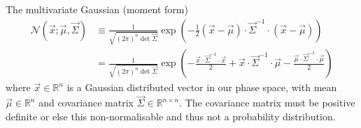 \documentclass[11pt,twoside]{report}
\begin{document}
The multivariate Gaussian (moment form)
\begin{equation}
  \begin{split}
    \mathcal{N}(\vec{x}; \vec{\mu}, \vec{\Sigma})
    &\equiv
    \frac{1}{\sqrt{ (2\pi)^n \det{\vec{\Sigma}} }}
    \exp{\left(
      - \frac{1}{2} (\vec{x} - \vec{\mu}) \cdot \vec{\Sigma}^{-1} \cdot (\vec{x} - \vec{\mu})
      \right)}
    \\
    &=
    \frac{1}{\sqrt{ (2\pi)^n \det{\vec{\Sigma}} }}
    \exp{\left(
      - \frac{\vec{x} \cdot \vec{\Sigma}^{-1} \cdot \vec{x}}{2}
      + \vec{x} \cdot \vec{\Sigma}^{-1} \cdot \vec{\mu}
      - \frac{\vec{\mu} \cdot \vec{\Sigma}^{-1} \cdot \vec{\mu}}{2}
      \right)}
  \end{split}
\end{equation}
where $\vec{x} \in \mathbb{R}^n$ is a Gaussian distributed vector in our phase space, with mean $\vec{\mu} \in \mathbb{R}^n$ and covariance matrix $\vec{\Sigma} \in \mathbb{R}^{n \times n}$.
The covariance matrix must be positive definite or else this non-normalisable and thus not a probability distribution.
\end{document}
